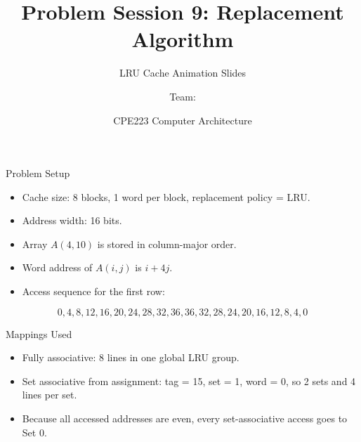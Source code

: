 \documentclass[aspectratio=169]{beamer}
\title{Problem Session 9: Replacement Algorithm}
\subtitle{LRU Cache Animation Slides}
\author{Team: \TeamName}
\date{CPE223 Computer Architecture}
\begin{document}
\begin{frame}{Problem Setup}
\begin{itemize}
    \item Cache size: 8 blocks, 1 word per block, replacement policy = LRU.
    \item Address width: 16 bits.
    \item Array $A(4,10)$ is stored in column-major order.
    \item Word address of $A(i,j)$ is $i + 4j$.
    \item Access sequence for the first row:
\end{itemize}

\[
0,4,8,12,16,20,24,28,32,36,36,32,28,24,20,16,12,8,4,0
\]

\begin{block}{Mappings Used}
\begin{itemize}
    \item Fully associative: 8 lines in one global LRU group.
    \item Set associative from assignment: tag = 15, set = 1, word = 0, so 2 sets and 4 lines per set.
    \item Because all accessed addresses are even, every set-associative access goes to Set 0.
\end{itemize}
\end{block}
\end{frame}
\end{document}
